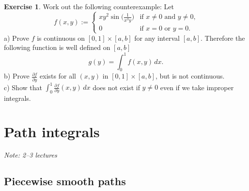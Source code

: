 \documentclass[12pt]{book}
\newcommand{\R}{{\mathbb{R}}}
\newcommand{\sectionnotes}[1]{\noindent \emph{Note: #1} \medskip \par}
\newcommand{\sectionnewpage}{\clearpage}
\theoremstyle{plain}
\theoremstyle{remark}
\theoremstyle{definition}
\theoremstyle{exercise}
\newtheorem{exercise}{Exercise}[section]
\theoremstyle{example}
\begin{document}
\begin{exercise}
Work out the following counterexample:  Let
\begin{equation*}
f(x,y) :=
\begin{cases}
xy^2 \sin\bigl(\frac{1}{x^3y}\bigr) & \text{if $x\not=0$ and $y\not= 0$,}\\
0 & \text{if $x=0$ or $y=0$.}
\end{cases}
\end{equation*}
a) Prove $f$ is continuous on $[0,1] \times [a,b]$ for any interval
$[a,b]$. Therefore the following function is well defined on $[a,b]$
\begin{equation*}
g(y) = \int_0^1 f(x,y) \, dx .
\end{equation*}
b) Prove $\frac{\partial f}{\partial y}$ exists for all $(x,y)$ in
$[0,1] \times [a,b]$, but is not continuous.
\\
c) Show that $\int_0^1 \frac{\partial f}{\partial y}(x,y) \, dx$ does not
exist if $y \not= 0$ even if we take improper integrals.
\end{exercise}

%
%
%
%
%



\sectionnewpage
\section{Path integrals}
\label{sec:pathintegral}

\sectionnotes{2--3 lectures}

\subsection{Piecewise smooth paths}
\end{document}
